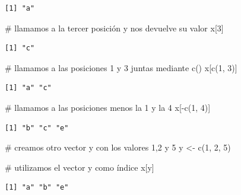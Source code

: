 \documentclass[
  spanish,
  a4paper,
]{scrbook}
\newenvironment{Shaded}{\begin{snugshade}}{\end{snugshade}}
\newcommand{\CommentTok}[1]{\textcolor[rgb]{0.37,0.37,0.37}{#1}}
\newcommand{\DecValTok}[1]{\textcolor[rgb]{0.68,0.00,0.00}{#1}}
\newcommand{\FunctionTok}[1]{\textcolor[rgb]{0.28,0.35,0.67}{#1}}
\newcommand{\NormalTok}[1]{\textcolor[rgb]{0.00,0.23,0.31}{#1}}
\newcommand{\OtherTok}[1]{\textcolor[rgb]{0.00,0.23,0.31}{#1}}
\newcommand{\SpecialCharTok}[1]{\textcolor[rgb]{0.37,0.37,0.37}{#1}}
\begin{document}
\begin{verbatim}
[1] "a"
\end{verbatim}

\begin{Shaded}
\begin{Highlighting}[]
\CommentTok{\# llamamos a la tercer posición y nos devuelve su valor}
\NormalTok{x[}\DecValTok{3}\NormalTok{]}
\end{Highlighting}
\end{Shaded}

\begin{verbatim}
[1] "c"
\end{verbatim}

\begin{Shaded}
\begin{Highlighting}[]
\CommentTok{\# llamamos a las posiciones 1 y 3 juntas mediante c()}
\NormalTok{x[}\FunctionTok{c}\NormalTok{(}\DecValTok{1}\NormalTok{, }\DecValTok{3}\NormalTok{)]}
\end{Highlighting}
\end{Shaded}

\begin{verbatim}
[1] "a" "c"
\end{verbatim}

\begin{Shaded}
\begin{Highlighting}[]
\CommentTok{\# llamamos a las posiciones menos la 1 y la 4}
\NormalTok{x[}\SpecialCharTok{{-}}\FunctionTok{c}\NormalTok{(}\DecValTok{1}\NormalTok{, }\DecValTok{4}\NormalTok{)]}
\end{Highlighting}
\end{Shaded}

\begin{verbatim}
[1] "b" "c" "e"
\end{verbatim}

\begin{Shaded}
\begin{Highlighting}[]
\CommentTok{\# creamos otro vector y con los valores 1,2 y 5}
\NormalTok{y }\OtherTok{\textless{}{-}} \FunctionTok{c}\NormalTok{(}\DecValTok{1}\NormalTok{, }\DecValTok{2}\NormalTok{, }\DecValTok{5}\NormalTok{)}

\CommentTok{\# utilizamos el vector y como índice}
\NormalTok{x[y]}
\end{Highlighting}
\end{Shaded}

\begin{verbatim}
[1] "a" "b" "e"
\end{verbatim}
\end{document}
